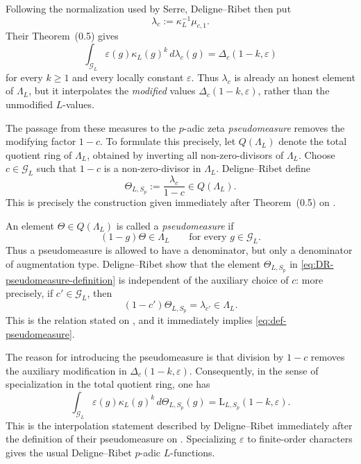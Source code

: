 \documentclass[11pt,table]{amsart}
\numberwithin{equation}{section}
\begin{document}
Following the normalization used by Serre, Deligne--Ribet then put
\[
        \lambda_c
        :=
        \kappa_L^{-1}\mu_{c,1}.
\]
Their Theorem~(0.5) gives
\begin{equation}
\label{eq:DR-lambda-c-interpolation}
        \int_{\mathcal G_L}
        \varepsilon(g)\kappa_L(g)^k
        \,d\lambda_c(g)
        =
        \Delta_c(1-k,\varepsilon)
\end{equation}
for every \(k\geq1\) and every locally constant \(\varepsilon\).
Thus \(\lambda_c\) is already an honest element of
\(\Lambda_L\), but it interpolates the \emph{modified} values
\(\Delta_c(1-k,\varepsilon)\), rather than the unmodified
\(L\)-values.

The passage from these measures to the \(p\)-adic zeta
\emph{pseudomeasure} removes the modifying factor \(1-c\).
To formulate this precisely, let $Q(\Lambda_L)$ denote the total quotient ring of \(\Lambda_L\), obtained by inverting
all non-zero-divisors of \(\Lambda_L\). Choose \(c\in\mathcal G_L\) such that \(1-c\) is a non-zero-divisor in
\(\Lambda_L\).  Deligne--Ribet define
\begin{equation}
\label{eq:DR-pseudomeasure-definition}
        \Theta_{L,S_p}
        :=
        \frac{\lambda_c}{1-c}
        \in
        Q(\Lambda_L).
\end{equation}
This is precisely the construction given immediately after
Theorem~(0.5) on
\cite[p.~232]{DeligneRibet}.

An element $\Theta\in Q(\Lambda_L)$
is called a \emph{pseudomeasure} if
\begin{equation}
\label{eq:def-pseudomeasure}
        (1-g)\Theta\in\Lambda_L
        \qquad
        \text{for every }g\in\mathcal G_L.
\end{equation}
Thus a pseudomeasure is allowed to have a denominator, but only a
denominator of augmentation type. Deligne--Ribet show that
the element \(\Theta_{L,S_p}\) in
\eqref{eq:DR-pseudomeasure-definition} is independent of the auxiliary
choice of \(c\): more precisely, if \(c'\in\mathcal G_L\), then
\begin{equation}
\label{eq:DR-pseudomeasure-relation}
        (1-c')\Theta_{L,S_p}
        =
        \lambda_{c'}
        \in\Lambda_L.
\end{equation}
This is the relation stated on
\cite[p.~232]{DeligneRibet}, and it immediately implies
\eqref{eq:def-pseudomeasure}.

The reason for introducing the pseudomeasure is that division by
\(1-c\) removes the auxiliary modification in
\(\Delta_c(1-k,\varepsilon)\).  Consequently, in the sense of
specialization in the total quotient ring, one has
\begin{equation}
\label{eq:DR-pseudomeasure-interpolation}
        \int_{\mathcal G_L}
        \varepsilon(g)\kappa_L(g)^k
        \,d\Theta_{L,S_p}(g)
        =
        \mathrm{L}_{L,S_p}(1-k,\varepsilon).
\end{equation}
This is the interpolation statement described by Deligne--Ribet
immediately after the definition of their pseudomeasure on
\cite[p.~232]{DeligneRibet}.  Specializing
\(\varepsilon\) to finite-order characters gives the usual
Deligne--Ribet \(p\)-adic \(L\)-functions.
\end{document}
